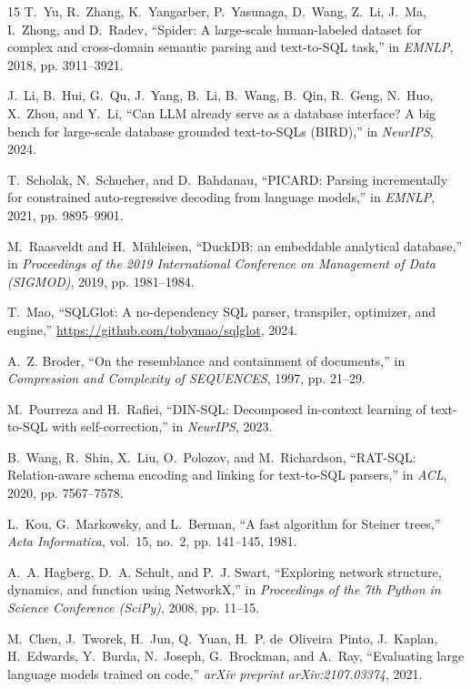 \documentclass[10pt,journal,compsoc]{IEEEtran}
\begin{document}
\begin{thebibliography}{15}
T.~Yu, R.~Zhang, K.~Yangarber, P.~Yasunaga, D.~Wang, Z.~Li, J.~Ma, I.~Zhong, and D.~Radev, ``Spider: A large-scale human-labeled dataset for complex and cross-domain semantic parsing and text-to-SQL task,'' in \emph{EMNLP}, 2018, pp. 3911--3921.

J.~Li, B.~Hui, G.~Qu, J.~Yang, B.~Li, B.~Wang, B.~Qin, R.~Geng, N.~Huo, X.~Zhou, and Y.~Li, ``Can LLM already serve as a database interface? A big bench for large-scale database grounded text-to-SQLs (BIRD),'' in \emph{NeurIPS}, 2024.

T.~Scholak, N.~Schucher, and D.~Bahdanau, ``PICARD: Parsing incrementally for constrained auto-regressive decoding from language models,'' in \emph{EMNLP}, 2021, pp. 9895--9901.

M.~Raasveldt and H.~M{\"u}hleisen, ``DuckDB: an embeddable analytical database,'' in \emph{Proceedings of the 2019 International Conference on Management of Data (SIGMOD)}, 2019, pp. 1981--1984.

T.~Mao, ``SQLGlot: A no-dependency SQL parser, transpiler, optimizer, and engine,'' \url{https://github.com/tobymao/sqlglot}, 2024.

A.~Z. Broder, ``On the resemblance and containment of documents,'' in \emph{Compression and Complexity of SEQUENCES}, 1997, pp. 21--29.

M.~Pourreza and H.~Rafiei, ``DIN-SQL: Decomposed in-context learning of text-to-SQL with self-correction,'' in \emph{NeurIPS}, 2023.

B.~Wang, R.~Shin, X.~Liu, O.~Polozov, and M.~Richardson, ``RAT-SQL: Relation-aware schema encoding and linking for text-to-SQL parsers,'' in \emph{ACL}, 2020, pp. 7567--7578.

L.~Kou, G.~Markowsky, and L.~Berman, ``A fast algorithm for Steiner trees,'' \emph{Acta Informatica}, vol.~15, no.~2, pp. 141--145, 1981.

A.~A. Hagberg, D.~A. Schult, and P.~J. Swart, ``Exploring network structure, dynamics, and function using NetworkX,'' in \emph{Proceedings of the 7th Python in Science Conference (SciPy)}, 2008, pp. 11--15.

M.~Chen, J.~Tworek, H.~Jun, Q.~Yuan, H.~P. de~Oliveira~Pinto, J.~Kaplan, H.~Edwards, Y.~Burda, N.~Joseph, G.~Brockman, and A.~Ray, ``Evaluating large language models trained on code,'' \emph{arXiv preprint arXiv:2107.03374}, 2021.


\end{thebibliography}
\end{document}
